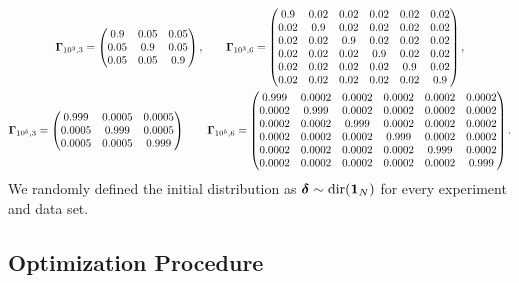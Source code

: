 \begin{gather*}
    \boldsymbol{\Gamma}_{10^3,3} = 
    \begin{pmatrix} 
        0.9 & 0.05 & 0.05 \\
        0.05 & 0.9 & 0.05 \\
        0.05 & 0.05 & 0.9
    \end{pmatrix},
    \qquad
    \boldsymbol{\Gamma}_{10^3,6} = 
    \begin{pmatrix} 
        0.9  & 0.02 & 0.02 & 0.02 & 0.02 & 0.02 \\
        0.02 & 0.9  & 0.02 & 0.02 & 0.02 & 0.02 \\
        0.02 & 0.02 & 0.9  & 0.02 & 0.02 & 0.02 \\
        0.02 & 0.02 & 0.02 & 0.9  & 0.02 & 0.02 \\
        0.02 & 0.02 & 0.02 & 0.02 & 0.9  & 0.02 \\
        0.02 & 0.02 & 0.02 & 0.02 & 0.02 & 0.9  \\
    \end{pmatrix},
    \\
    \boldsymbol{\Gamma}_{10^5,3} = 
    \begin{pmatrix} 
        0.999 & 0.0005 & 0.0005 \\
        0.0005 & 0.999 & 0.0005 \\
        0.0005 & 0.0005 & 0.999
    \end{pmatrix}
    \qquad
    \boldsymbol{\Gamma}_{10^5,6} = 
    \begin{pmatrix} 
        0.999  & 0.0002 & 0.0002 & 0.0002 & 0.0002 & 0.0002 \\
        0.0002 & 0.999  & 0.0002 & 0.0002 & 0.0002 & 0.0002 \\
        0.0002 & 0.0002 & 0.999  & 0.0002 & 0.0002 & 0.0002 \\
        0.0002 & 0.0002 & 0.0002 & 0.999  & 0.0002 & 0.0002 \\
        0.0002 & 0.0002 & 0.0002 & 0.0002 & 0.999  & 0.0002 \\
        0.0002 & 0.0002 & 0.0002 & 0.0002 & 0.0002 & 0.999  \\
    \end{pmatrix}.
\end{gather*}
\fi
%
We randomly defined the initial distribution as $\boldsymbol{\delta} \sim \text{dir}(\mathbf{1}_N)$ for every experiment and data set.

\subsection{Optimization Procedure}

